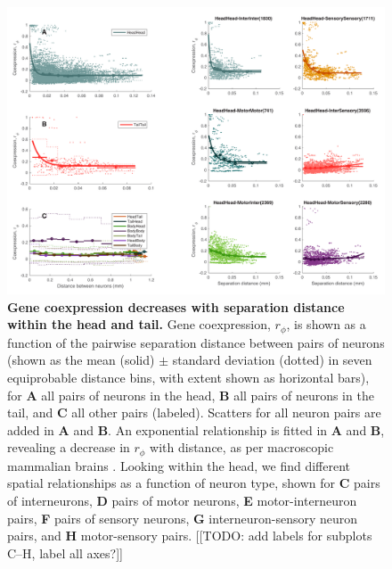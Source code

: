 \documentclass[10pt,letterpaper]{article}
\begin{document}
\begin{figure}[h]
\centering
    \includegraphics[width=1\textwidth]{DistanceCoexpression.pdf}
\caption{
\label{fig:S_distCoexp}
\textbf{Gene coexpression decreases with separation distance within the head and tail.}
Gene coexpression, $r_\phi$, is shown as a function of the pairwise separation distance between pairs of neurons (shown as the mean (solid) $\pm$ standard deviation (dotted) in seven equiprobable distance bins, with extent shown as horizontal bars), for \textbf{A} all pairs of neurons in the head, \textbf{B} all pairs of neurons in the tail, and \textbf{C} all other pairs (labeled).
Scatters for all neuron pairs are added in \textbf{A} and \textbf{B}.
An exponential relationship is fitted in \textbf{A} and \textbf{B}, revealing a decrease in $r_\phi$ with distance, as per macroscopic mammalian brains \cite{Fulcher:2016ck, Krienen:2016eq}.
Looking within the head, we find different spatial relationships as a function of neuron type, shown for \textbf{C} pairs of interneurons, \textbf{D} pairs of motor neurons, \textbf{E} motor-interneuron pairs, \textbf{F} pairs of sensory neurons, \textbf{G} interneuron-sensory neuron pairs, and \textbf{H} motor-sensory pairs.
[[TODO: add labels for subplots C--H, label all axes?]]
}
\end{figure}
\end{document}
